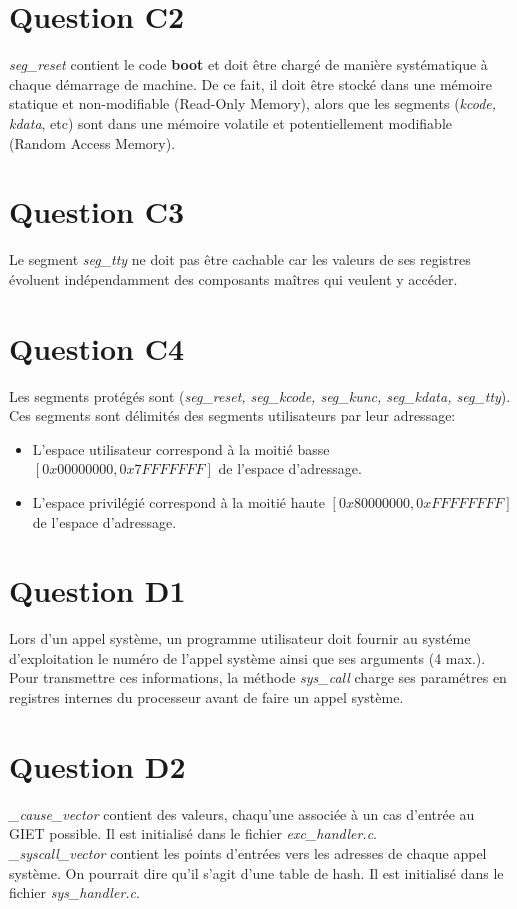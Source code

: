 \documentclass[10pt]{article}
\begin{document}
\section{Question C2}
{\it seg\_reset} contient le code {\bf boot} et doit être chargé de manière
systématique à chaque démarrage de machine. De ce fait, il doit être stocké dans
une mémoire statique et non-modifiable (Read-Only Memory), alors que les segments
({\it kcode, kdata}, etc) sont dans une mémoire volatile et potentiellement
modifiable (Random Access Memory).

\section{Question C3}
Le segment {\it seg\_tty} ne doit pas être cachable car les valeurs de ses registres
évoluent indépendamment des composants maîtres qui veulent y accéder.

\section{Question C4}
Les segments protégés sont ({\it seg\_reset, seg\_kcode, seg\_kunc, seg\_kdata, seg\_tty}).\\
Ces segments sont délimités des segments utilisateurs par leur adressage:
\begin{itemize}
  \item L'espace utilisateur correspond à la moitié basse
    $[0x00000000,0x7FFFFFFF]$ de l'espace d'adressage.
  \item L'espace privilégié correspond à la moitié haute
    $[0x80000000,0xFFFFFFFF]$ de l'espace d'adressage.
\end{itemize}

\section{Question D1}
Lors d'un appel système, un programme utilisateur doit fournir au systéme
d'exploitation le numéro de l'appel système ainsi que ses arguments (4 max.).\\
Pour transmettre ces informations, la méthode {\it sys\_call} charge ses paramétres
en registres internes du processeur avant de faire un appel système.

\section{Question D2}
{\it \_cause\_vector} contient des valeurs, chaqu'une associée à un cas d'entrée
au GIET possible. Il est initialisé dans le fichier {\it exc\_handler.c}.\\
{\it \_syscall\_vector} contient les points d'entrées vers les adresses de chaque
appel système. On pourrait dire qu'il s'agit d'une table de hash. Il est initialisé
dans le fichier {\it sys\_handler.c}.
\end{document}
